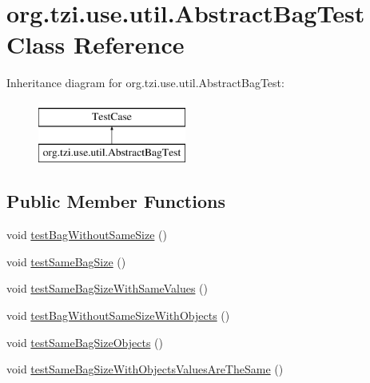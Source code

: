 \hypertarget{classorg_1_1tzi_1_1use_1_1util_1_1_abstract_bag_test}{\section{org.\-tzi.\-use.\-util.\-Abstract\-Bag\-Test Class Reference}
\label{classorg_1_1tzi_1_1use_1_1util_1_1_abstract_bag_test}
}
Inheritance diagram for org.\-tzi.\-use.\-util.\-Abstract\-Bag\-Test\-:\begin{figure}[H]
\begin{center}
\leavevmode
\includegraphics[height=2.000000cm]{classorg_1_1tzi_1_1use_1_1util_1_1_abstract_bag_test}
\end{center}
\end{figure}
\subsection*{Public Member Functions}
\begin{DoxyCompactItemize}
\item 
void \hyperlink{classorg_1_1tzi_1_1use_1_1util_1_1_abstract_bag_test_a7e6efd2f3ea9e36eb0a048fc7e2fb7c5}{test\-Bag\-Without\-Same\-Size} ()
\item 
void \hyperlink{classorg_1_1tzi_1_1use_1_1util_1_1_abstract_bag_test_ac8a3f38386635e2204b1ddb137aa5955}{test\-Same\-Bag\-Size} ()
\item 
void \hyperlink{classorg_1_1tzi_1_1use_1_1util_1_1_abstract_bag_test_a530fd86f9f42c99fa75b876ee6024841}{test\-Same\-Bag\-Size\-With\-Same\-Values} ()
\item 
void \hyperlink{classorg_1_1tzi_1_1use_1_1util_1_1_abstract_bag_test_aa0c759012f61b0834872c8f7969483d5}{test\-Bag\-Without\-Same\-Size\-With\-Objects} ()
\item 
void \hyperlink{classorg_1_1tzi_1_1use_1_1util_1_1_abstract_bag_test_a434a8020c247a444e6d889821113206f}{test\-Same\-Bag\-Size\-Objects} ()
\item 
void \hyperlink{classorg_1_1tzi_1_1use_1_1util_1_1_abstract_bag_test_a68bef53ef108ccbeebed971157025cab}{test\-Same\-Bag\-Size\-With\-Objects\-Values\-Are\-The\-Same} ()
\end{DoxyCompactItemize}


